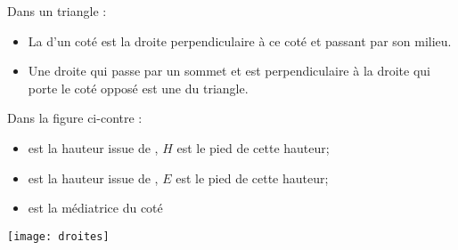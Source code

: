 \begin{mydefs}
	Dans un triangle :
	\begin{itemize}
		\item La \hspace*{4cm} d'un coté est la droite perpendiculaire à ce coté et passant par son milieu.
		
		\item Une droite qui passe par un sommet et est perpendiculaire à la droite qui porte le coté opposé est une \hspace*{3cm} du triangle. 
	\end{itemize}
\end{mydefs}

\begin{myexs}
	\begin{multicols}{2}
		Dans la figure ci-contre :
		
		\begin{itemize}
			\item \hspace*{1cm} est la hauteur issue de \hspace*{1cm}, $H$ est le pied de cette hauteur;
			\item \hspace*{1cm} est la hauteur issue de \hspace*{1cm}, $E$ est le pied de cette hauteur;
			\item \hspace*{1cm} est la médiatrice du coté 
		\end{itemize}
		\begin{center}
			\texttt{[image: droites]}
		\end{center}
	\end{multicols}
\end{myexs}